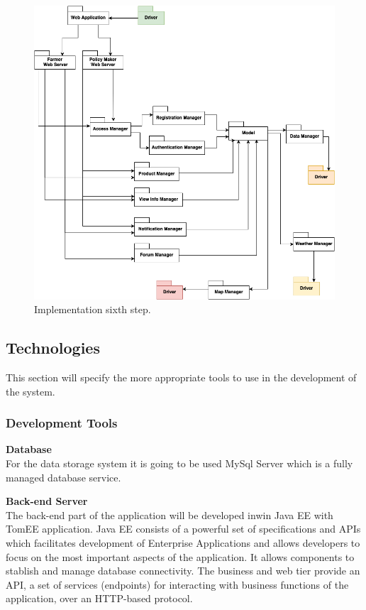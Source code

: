 \begin{enumerate}
\begin{figure}[H]
\begin{center}
        \includegraphics[width=1\textwidth]{implementation/step6.png}
        \caption{Implementation sixth step.}
        \label{fig:sixth step}
        \end{center}
    \end{figure}
\end{enumerate}

\newpage
\subsection{Technologies}
This section will specify the more appropriate tools to use in the development of the system. 

\subsubsection{Development Tools}

\textbf{Database}\\
For the data storage system it is going to be used MySql Server which is a fully managed database service.

\noindent\textbf{Back-end Server}\\
The back-end part of the application will be developed inwin Java EE with TomEE application. 
Java EE consists of a powerful set of specifications and APIs which facilitates development of Enterprise Applications and allows developers to focus on the most important aspects of the application. 
It allows components to stablish and manage database connectivity.
The business and web tier provide an API, a set of services (endpoints) for interacting with business functions of the application, over an HTTP-based protocol.



